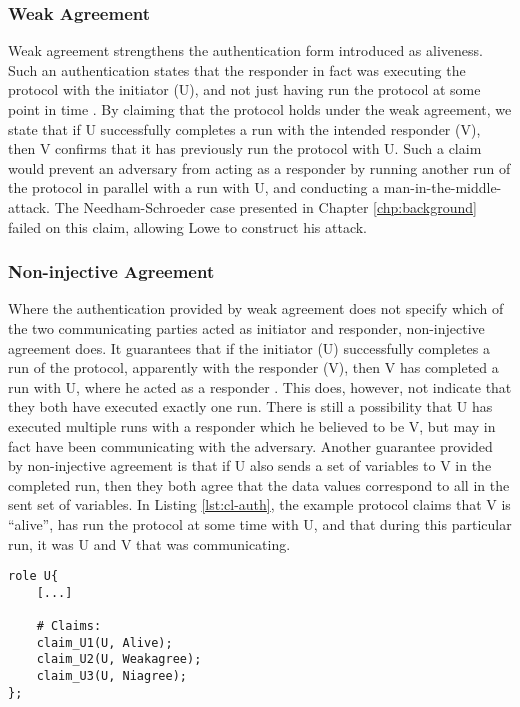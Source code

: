 \subsubsection{Weak Agreement}

Weak agreement strengthens the authentication form introduced as aliveness. Such an authentication states that the responder in fact was executing the protocol with the initiator (U), and not just having run the protocol at some point in time \cite{lowe1997hierarchy}. By claiming that the protocol holds under the weak agreement, we state that if U successfully completes a run with the intended responder (V), then V confirms that it has previously run the protocol with U. Such a claim would prevent an adversary from acting as a responder by running another run of the protocol in parallel with a run with U, and conducting a man-in-the-middle-attack. The Needham-Schroeder case presented in Chapter \ref{chp:background} failed on this claim, allowing Lowe to construct his attack. 


\subsubsection{Non-injective Agreement}

Where the authentication provided by weak agreement does not specify which of the two communicating parties acted as initiator and responder, non-injective agreement does. It guarantees that if the initiator (U) successfully completes a run of the protocol, apparently with the responder (V), then V has completed a run with U, where he acted as a responder \cite{lowe1997hierarchy}. This does, however, not indicate that they both have executed exactly one run. There is still a possibility that U has executed multiple runs with a responder which he believed to be V, but may in fact have been communicating with the adversary. Another guarantee provided by non-injective agreement is that if U also sends a set of variables to V in the completed run, then they both agree that the data values correspond to all in the sent set of variables. In Listing \ref{lst:cl-auth}, the example protocol claims that V is ``alive'', has run the protocol at some time with U, and that during this particular run, it was U and V that was communicating.\newline

\begin{lstlisting}[caption={Example of how to claim authentication by use of alive, weak-agreement, and non-injective agreement.}, label={lst:cl-auth}]
role U{
	[...]
	
	# Claims:
	claim_U1(U, Alive);
	claim_U2(U, Weakagree);
	claim_U3(U, Niagree);
};
\end{lstlisting} 


